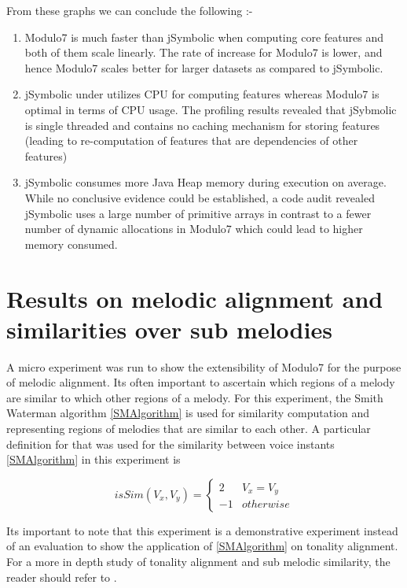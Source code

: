 \newpage

\noindent From these graphs we can conclude the following :-

\begin{enumerate}
\item Modulo7 is much faster than jSymbolic when computing core features and both of them scale linearly. The rate of increase for Modulo7 is lower, and hence Modulo7 scales better for larger datasets as compared to jSymbolic.
\item jSymbolic under utilizes CPU for computing features whereas Modulo7 is optimal in terms of CPU usage. The profiling results revealed that jSybmolic is single threaded and contains no caching mechanism for storing features (leading to re-computation of features that are dependencies of other features)
\item jSymbolic consumes more Java Heap memory during execution on average. While no conclusive evidence could be established, a code audit revealed jSymbolic uses a large number of primitive arrays \cite{jSymbolicCode} in contrast to a fewer number of dynamic allocations in Modulo7 which could lead to higher memory consumed. 
\end{enumerate}

\section{Results on melodic alignment and similarities over sub melodies} \label{melodicalignmentexpt}

\noindent A micro experiment was run to show the extensibility of Modulo7 for the purpose of melodic alignment. Its often important to ascertain which regions of a melody are similar to which other regions of a melody. For this experiment, the Smith Waterman algorithm \ref{SMAlgorithm} is used for similarity computation and representing regions of melodies that are similar to each other. A particular definition for that was used for the similarity between voice instants \ref{SMAlgorithm} in this experiment is 

\begin{equation}
isSim(V_x, V_y) = \begin{cases}
2 & V_x = V_y \\
-1 & otherwise
\end{cases}
\end{equation}

\noindent Its important to note that this experiment is a demonstrative experiment instead of an evaluation to show the application of \ref{SMAlgorithm} on tonality alignment. For a more in depth study of tonality alignment and sub melodic similarity, the reader should refer to \cite{smithWatermanBook}.  \\

